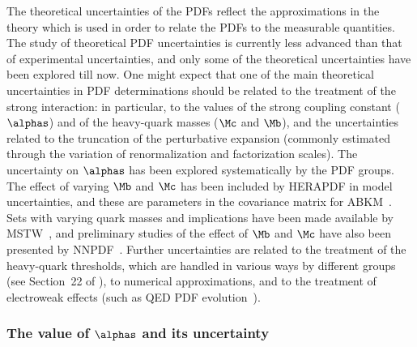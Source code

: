 The theoretical uncertainties of the PDFs
reflect the approximations in the theory
which is used in order to relate the PDFs to the measurable quantities.
The study of theoretical PDF uncertainties is currently less advanced
than that of  experimental uncertainties, and only some of
the theoretical
uncertainties have been explored till now. One might expect that one of 
the main theoretical uncertainties in PDF determinations
should be related to the treatment of the strong interaction: in
particular, to the values of the strong coupling constant ($\alphas$) 
and of the heavy-quark masses  ($\Mc$ and
$\Mb$), and the uncertainties related to the truncation of the perturbative
expansion (commonly estimated through the variation of renormalization
and factorization scales). The uncertainty on $\alphas$ has
been explored systematically by the PDF groups. The  effect of varying $\Mb$ and
$\Mc$ has been included by HERAPDF in  
model uncertainties, and these are parameters in the covariance matrix for 
ABKM~\cite{Alekhin:2009ni}. Sets with varying quark masses 
and implications have been 
made available by MSTW~\cite{Martin:2010db}, and 
preliminary studies of the effect of $\Mb$ and $\Mc$ have also been 
presented by NNPDF~\cite{Guffanti:2010yu}.
 Further uncertainties are related to the
treatment of the heavy-quark thresholds, which are handled in various ways
by different groups (see Section~22 of ), 
to numerical approximations,
and to the treatment of electroweak effects (such as QED PDF evolution~\cite{Martin:2004dh}).

\subsubsection{The value of $\alphas$ and its uncertainty}

